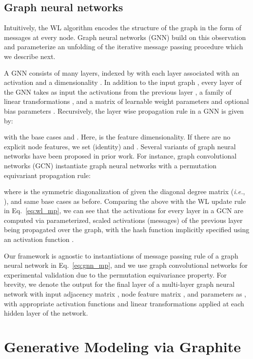 \documentclass{article}
\newcommand{\name}{Graphite}
\begin{document}
\subsection{Graph neural networks}
Intuitively, the WL algorithm encodes the structure of the graph in the form of messages at every node.
Graph neural networks (GNN) build on this observation and parameterize an unfolding of the iterative message passing procedure which we describe next.


A GNN consists of many layers, indexed by  with each layer associated with an activation  and a dimensionality . In addition to the input graph , every layer  of the GNN takes as input the activations from the previous layer , a family of linear transformations , and a matrix of learnable weight parameters  and optional bias parameters . Recursively, the layer wise propagation rule in a GNN is given by:

with the base cases  and .
Here,  is the feature dimensionality.
If there are no explicit node features, we set  (identity) and .  
Several variants of graph neural networks have been proposed in prior work. For instance, graph convolutional networks (GCN) \cite{kipf2016semi} instantiate graph neural networks with a permutation equivariant propagation rule:

where  is the symmetric diagonalization of  given the diagonal degree matrix  (\textit{i.e.}, ), and same base cases as before.
Comparing the above with the WL update rule in Eq.~\eqref{eq:wl_mp}, we can see that the activations for every layer in a GCN are computed via parameterized, scaled activations (messages) of the previous layer being propagated over the graph, with the hash function implicitly specified using an activation function . 

Our framework is agnostic to  instantiations of message passing rule of a graph neural network in Eq.~\eqref{eq:gnn_mp}, and we use graph convolutional networks for experimental validation due to the permutation equivariance property. For brevity, we denote the output  for the final layer of a multi-layer graph neural network with input adjacency matrix , node feature matrix , and parameters  as , with appropriate activation functions and linear transformations applied at each hidden layer of the network.
 \section{Generative Modeling via \name{}}\label{sec:framework}
\end{document}
